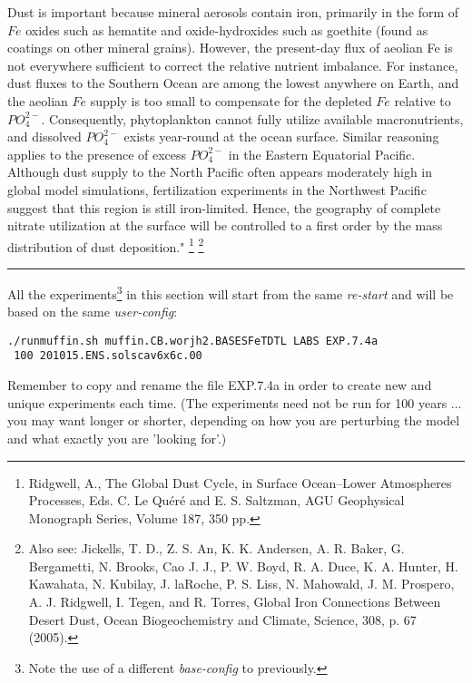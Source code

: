 \documentclass[11pt,fleqn]{book} %
\begin{document}
Dust is important because mineral aerosols contain iron, primarily in the form of \(Fe\) oxides such as hematite and oxide-hydroxides such as goethite (found as coatings on other mineral grains). However, the present-day flux of aeolian Fe is not everywhere sufficient to correct the relative nutrient imbalance. For instance, dust fluxes to the Southern Ocean are among the lowest anywhere on Earth, and the aeolian \(Fe\) supply is too small to compensate for the depleted \(Fe\) relative to \(PO^{2-}_{4}\). Consequently, phytoplankton cannot fully utilize available macronutrients, and dissolved \(PO^{2-}_{4}\) exists year-round at the ocean surface. Similar reasoning applies to the presence of excess \(PO^{2-}_{4}\) in the Eastern Equatorial Pacific. Although dust supply to the North Pacific often appears moderately high in global model simulations, fertilization experiments in the Northwest Pacific suggest that this region is still iron-limited. Hence, the geography of complete nitrate utilization at the surface will be controlled to a first order by the mass distribution of dust deposition." \footnote{Ridgwell, A., The Global Dust Cycle, in Surface Ocean--Lower Atmospheres Processes, Eds. C. Le Quéré and E. S. Saltzman, AGU Geophysical Monograph Series, Volume 187, 350 pp.} \footnote{Also see: Jickells, T. D., Z. S. An, K. K. Andersen, A. R. Baker, G. Bergametti, N. Brooks, Cao J. J., P. W. Boyd, R. A. Duce, K. A. Hunter, H. Kawahata, N. Kubilay, J. laRoche, P. S. Liss, N. Mahowald, J. M. Prospero, A. J. Ridgwell, I. Tegen, and R. Torres, Global Iron Connections Between Desert Dust, Ocean Biogeochemistry and Climate, Science, 308, p. 67 (2005).}

\vspace{1mm}
\noindent\rule{4cm}{0.1mm}
\vspace{2mm}

\noindent All the experiments\footnote{Note the use of a different \textit{base-config} to previously.} in this section will start from the same \textit{re-start} and will be based on the same \textit{user-config}:
\vspace{-2mm}\begin{verbatim}
./runmuffin.sh muffin.CB.worjh2.BASESFeTDTL LABS EXP.7.4a
 100 201015.ENS.solscav6x6c.00
\end{verbatim}\vspace{-2mm}
Remember to copy and rename the file \textsf{\footnotesize EXP.7.4a} in order to create new and unique experiments each time. (The experiments need not be run for 100 years ... you may want longer or shorter, depending on how you are perturbing the model and what exactly you are 'looking for'.)
\end{document}
